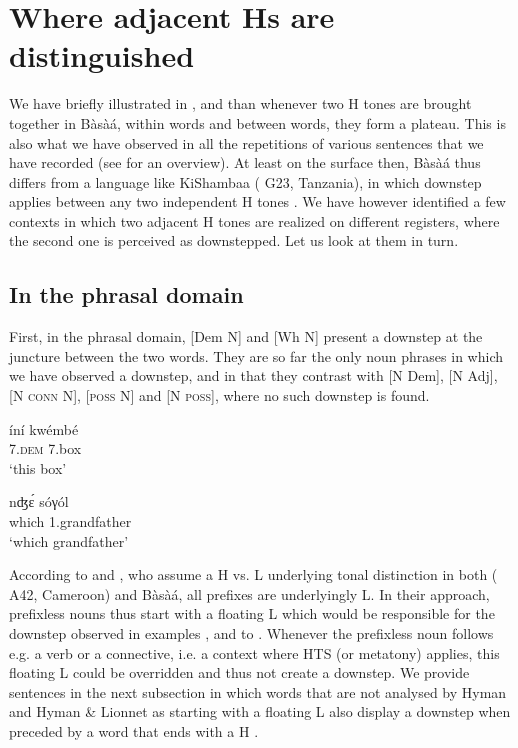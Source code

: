 \documentclass[output=paper,newtxmath,modfonts,nonflat]{langsci/langscibook}
\begin{document}
\section{Where adjacent Hs are distinguished}\label{sec:HamlaouiMakasso:3} 

We have briefly illustrated in ,  and  than whenever two H tones are brought together in Bàsà{á}, within words and between words, they form a plateau. This is also what we have observed in all the repetitions of various sentences that we have recorded (see \citet{MakassoEtAl17} for an overview). At least on the surface then, Bàsà{á} thus differs from a language like KiShambaa ( G23, Tanzania), in which downstep applies between any two independent H tones \citep{Odden82}. We have however identified a few contexts in which two adjacent H tones are realized on different registers, where the second one is perceived as downstepped. Let us look at them in turn.



\subsection{In the phrasal domain}

First, in the phrasal domain, [Dem N] and [Wh N] present a downstep at the juncture between the two words. They are so far the only noun phrases in which we have observed a downstep, and in that they contrast with [N Dem], [N Adj], [N \textsc{conn} N], [\textsc{poss} N] and [N \textsc{poss}], where no such downstep is found. 

\ea \gll íní {\textdownstep}kwémbé\\
7.\textsc{dem} 7.box\\
\glt `this box'\label{ex:HamlaouiMakasso:5}\\
\z

\ea \gll nʤ\'ɛ {\textdownstep}sóγól\\
which 1.grandfather\\
\glt `which grandfather' \label{ex:HamlaouiMakasso:6}\\
\z

\noindent According to \citet{Hyman03} and \citet{HymanLionnet14}, who assume a H vs. L underlying tonal distinction in both  ( A42, Cameroon) and Bàsà{á}, all  prefixes are underlyingly L. In their approach, prefixless nouns thus start with a floating L  which would be responsible for the downstep observed in examples ,  and  to . Whenever the prefixless noun follows e.g. a verb or a connective, i.e. a context where HTS (or metatony) applies, this floating L  could be overridden and thus not create a downstep. We provide sentences in the next subsection in which words that are not analysed by Hyman and Hyman \& Lionnet as starting with a floating L  also display a downstep when preceded by a word that ends with a H .
\end{document}
